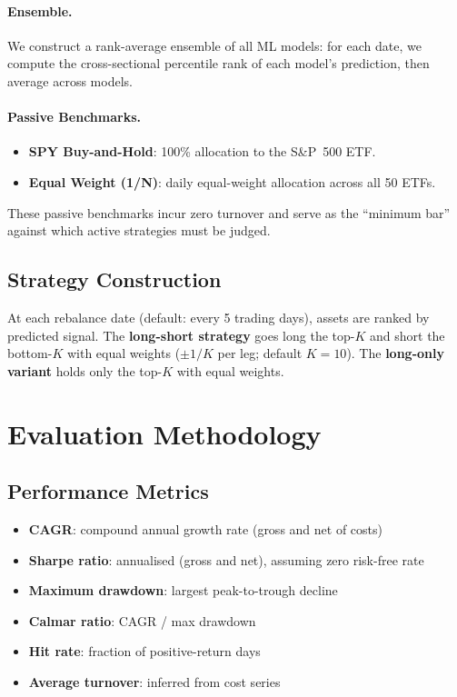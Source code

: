 \documentclass[preprint,review,12pt]{elsarticle}
\begin{document}
\paragraph{Ensemble.}
We construct a rank-average ensemble of all ML models: for each date, we compute the cross-sectional percentile rank of each model's prediction, then average across models.

\paragraph{Passive Benchmarks.}
\begin{itemize}[leftmargin=1.4em]
  \item \textbf{SPY Buy-and-Hold}: 100\% allocation to the S\&P~500 ETF.
  \item \textbf{Equal Weight (1/N)}: daily equal-weight allocation across all 50 ETFs.
\end{itemize}

These passive benchmarks incur zero turnover and serve as the ``minimum bar'' against which active strategies must be judged.

\subsection{Strategy Construction}

At each rebalance date (default: every 5 trading days), assets are ranked by predicted signal.
The \textbf{long-short strategy} goes long the top-$K$ and short the bottom-$K$ with equal weights ($\pm 1/K$ per leg; default $K=10$).
The \textbf{long-only variant} holds only the top-$K$ with equal weights.


\section{Evaluation Methodology}
\label{sec:evaluation}

\subsection{Performance Metrics}

\begin{itemize}[leftmargin=1.4em]
  \item \textbf{CAGR}: compound annual growth rate (gross and net of costs)
  \item \textbf{Sharpe ratio}: annualised (gross and net), assuming zero risk-free rate
  \item \textbf{Maximum drawdown}: largest peak-to-trough decline
  \item \textbf{Calmar ratio}: CAGR / max drawdown
  \item \textbf{Hit rate}: fraction of positive-return days
  \item \textbf{Average turnover}: inferred from cost series
\end{itemize}
\end{document}
